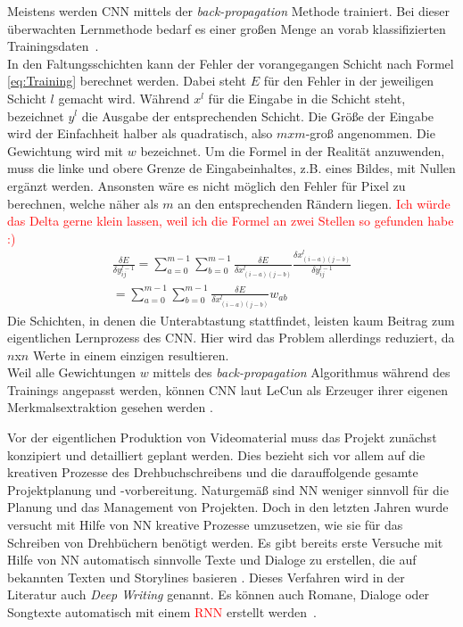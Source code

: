 \documentclass[times, 11pt,twocolumn]{article}
\begin{document}
 \label{sec:Training}
Meistens werden CNN mittels der \textit{back-propagation} Methode trainiert. Bei dieser überwachten Lernmethode bedarf es einer großen Menge an vorab klassifizierten Trainingsdaten~\cite{5537907}.  \\
In den Faltungsschichten kann der Fehler der vorangegangen Schicht nach Formel \ref{eq:Training} berechnet werden. Dabei steht $E$ für den Fehler in der jeweiligen Schicht $l$ gemacht wird. Während $x^l$ für die Eingabe in die Schicht steht, bezeichnet $y^l$ die Ausgabe der entsprechenden Schicht. Die Größe der Eingabe wird der Einfachheit halber als quadratisch, also $mxm$-groß angenommen. Die Gewichtung wird mit $w$ bezeichnet. Um die Formel in der Realität anzuwenden, muss die linke und obere Grenze de Eingabeinhaltes, z.B. eines Bildes, mit Nullen ergänzt werden. Ansonsten wäre es nicht möglich den Fehler für Pixel zu berechnen, welche näher als $m$ an den entsprechenden Rändern liegen. \textcolor{red}{Ich würde das Delta gerne klein lassen, weil ich die Formel an zwei Stellen so gefunden habe :)}\\
\footnotesize
\begin{equation}
\begin{aligned}
\frac{\delta E}{\delta y_{ij}^{l-1}} = \sum_{a=0}^{m-1} \sum_{b=0}^{m-1} \frac{\delta E}{\delta x_{(i-a)(j-b)}^{l}} \frac{\delta x_{(i-a)(j-b)}^{l}}{\delta y_{ij}^{l-1}}  \\
= \sum \limits_{a=0}^{m-1} \sum \limits_{b=0}^{m-1} \frac{\delta E}{\delta x_{(i-a)(j-b)}^{l}} w_{ab}
\end{aligned}
	\label{eq:Training}
\end{equation}
\small
Die Schichten, in denen die Unterabtastung stattfindet, leisten kaum Beitrag zum eigentlichen Lernprozess des CNN. Hier wird das Problem allerdings reduziert, da $n$x$n$ Werte in einem einzigen resultieren. \\
Weil alle Gewichtungen $w$ mittels des \textit{back-propagation} Algorithmus während des Trainings angepasst werden, können CNN laut LeCun als Erzeuger ihrer eigenen Merkmalsextraktion gesehen werden \cite{LeCun:1998:CNI:303568.303704}.


 \label{sec:Konzeption}
Vor der eigentlichen Produktion von Videomaterial muss das Projekt zunächst konzipiert und detailliert geplant werden. Dies bezieht sich vor allem auf die kreativen Prozesse des Drehbuchschreibens und die darauffolgende gesamte Projektplanung und -vorbereitung. Naturgemäß sind NN weniger sinnvoll für die Planung und das Management von Projekten. Doch in den letzten Jahren wurde versucht mit Hilfe von NN kreative Prozesse umzusetzen, wie sie für das Schreiben von Drehbüchern benötigt werden. Es gibt bereits erste Versuche mit Hilfe von NN automatisch sinnvolle Texte und Dialoge zu erstellen, die auf bekannten Texten und Storylines basieren \cite{Thoma16}. Dieses Verfahren wird in der Literatur auch \textit{Deep Writing} genannt. Es können auch Romane, Dialoge oder Songtexte automatisch mit einem \textcolor{red}{RNN} erstellt werden~\cite{DrehbuchWrite}.
\end{document}

